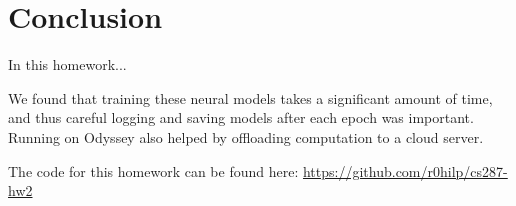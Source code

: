 \documentclass[11pt]{article}
\begin{document}
\section{Conclusion}

In this homework...

We found that training these neural models takes a significant amount of time, and thus careful logging and saving models after each epoch was important. Running on Odyssey also helped by offloading computation to a cloud server.

The code for this homework can be found here: \url{https://github.com/r0hilp/cs287-hw2}



\end{document}
